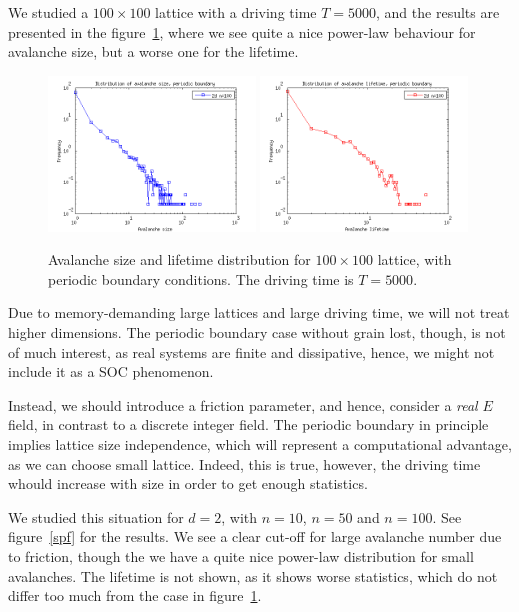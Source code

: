 We studied a $100\times 100$ lattice with a driving time $T=5000$, and the results are presented in the figure~\ref{sp}, 
where we see quite a nice power-law behaviour for avalanche size, but a worse one for the lifetime. 


\begin{figure} 
\begin{center}
\includegraphics[width=0.49\textwidth]{results/sp.png}
\includegraphics[width=0.49\textwidth]{results/tp.png} 
\caption{Avalanche size and lifetime distribution for $100\times100$ lattice, with periodic boundary conditions. 
The driving time is $T=5000$.  }
\label{sp}
\end{center}
\end{figure} 

Due to memory-demanding large lattices and large driving time, we will not treat higher dimensions.
The periodic boundary case without grain lost, though, is not of much interest, as real systems are finite and dissipative, 
hence, we might not include it as a SOC phenomenon. 

Instead, we should introduce a friction parameter, and hence, consider a \emph{real} $E$ field, in contrast to a discrete integer field. 
The periodic boundary in principle implies lattice size independence, which will represent a computational advantage, as we can choose small lattice.
Indeed, this is true, however, the driving time whould increase with size in order to get enough statistics. 

We studied this situation for $d=2$, with $n=10$, $n=50$ and $n=100$. See figure~\ref{spf} for the results. 
We see a clear cut-off for large avalanche number due to friction, though the we have a quite nice power-law distribution for small avalanches.
The lifetime is not shown, as it shows worse statistics, which do not differ too much from the case in figure~\ref{sp}.

